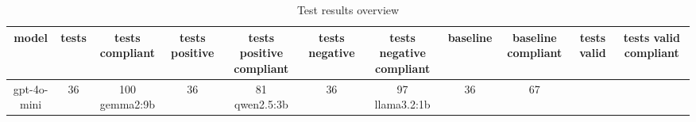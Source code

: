 
  \begin{table}[h!]
  \centering
  \begin{tabular}{|c|c|c|c|c|c|c|c|c|c|c|}
  \hline
  model & tests & tests compliant & tests positive & tests positive compliant & tests negative & tests negative compliant & baseline & baseline compliant & tests valid & tests valid compliant \\
  \hline
  gpt-4o-mini & 36 & 100%
\hline
gemma2:9b & 36 & 81%
\hline
qwen2.5:3b & 36 & 97%
\hline
llama3.2:1b & 36 & 67%
  \end{tabular}
  \caption{Test results overview}
  
  \end{table}
  